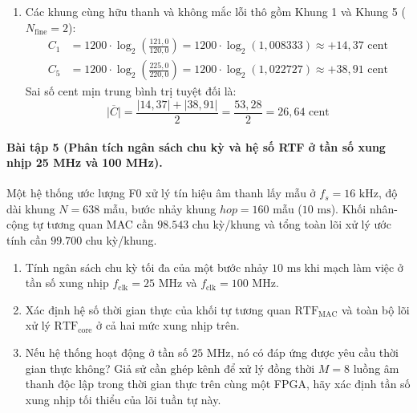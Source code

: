 \begin{enumerate}[label=\alph*)]
    \item Các khung cùng hữu thanh và không mắc lỗi thô gồm Khung 1 và Khung 5 ($N_{\text{fine}} = 2$):
    \begin{align}
        C_1 &= 1200 \cdot \log_2\left(\frac{121{,}0}{120{,}0}\right) = 1200 \cdot \log_2(1{,}008333) \approx +14{,}37\text{ cent} \\
        C_5 &= 1200 \cdot \log_2\left(\frac{225{,}0}{220{,}0}\right) = 1200 \cdot \log_2(1{,}022727) \approx +38{,}91\text{ cent}
    \end{align}
    Sai số cent mịn trung bình trị tuyệt đối là:
    \begin{equation}
        \overline{|C|} = \frac{|14{,}37| + |38{,}91|}{2} = \frac{53{,}28}{2} = 26{,}64\text{ cent}
    \end{equation}
\end{enumerate}

\paragraph{Bài tập 5 (Phân tích ngân sách chu kỳ và hệ số RTF ở tần số xung nhịp 25 MHz và 100 MHz).}
Một hệ thống ước lượng F0 xử lý tín hiệu âm thanh lấy mẫu ở $f_s = 16\text{ kHz}$, độ dài khung $N = 638$ mẫu, bước nhảy khung $hop = 160$ mẫu ($10\text{ ms}$). Khối nhân-cộng tự tương quan MAC cần $98.543$ chu kỳ/khung và tổng toàn lõi xử lý ước tính cần $99.700$ chu kỳ/khung.
\begin{enumerate}[label=\alph*)]
    \item Tính ngân sách chu kỳ tối đa của một bước nhảy $10\text{ ms}$ khi mạch làm việc ở tần số xung nhịp $f_{\text{clk}} = 25\text{ MHz}$ và $f_{\text{clk}} = 100\text{ MHz}$.
    \item Xác định hệ số thời gian thực của khối tự tương quan $\text{RTF}_{\text{MAC}}$ và toàn bộ lõi xử lý $\text{RTF}_{\text{core}}$ ở cả hai mức xung nhịp trên.
    \item Nếu hệ thống hoạt động ở tần số $25\text{ MHz}$, nó có đáp ứng được yêu cầu thời gian thực không? Giả sử cần ghép kênh để xử lý đồng thời $M = 8$ luồng âm thanh độc lập trong thời gian thực trên cùng một FPGA, hãy xác định tần số xung nhịp tối thiểu của lõi tuần tự này.
\end{enumerate}

